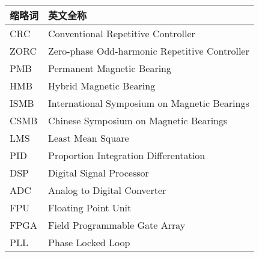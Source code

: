\noindent\begin{tabu} to \textwidth {|X[1,c]|X[4,c]|}\hline
缩略词 & 英文全称 \\ \hline
CRC & Conventional Repetitive Controller \\ \hline
ZORC & Zero-phase Odd-harmonic Repetitive Controller \\ \hline
PMB & Permanent Magnetic Bearing \\ \hline
HMB & Hybrid Magnetic Bearing \\ \hline
ISMB & International Symposium on Magnetic Bearings \\ \hline
CSMB & Chinese Symposium on Magnetic Bearings \\ \hline
LMS & Least Mean Square \\ \hline
PID & Proportion Integration Differentation\\ \hline
DSP & Digital Signal Processor \\ \hline
ADC & Analog to Digital Converter\\ \hline
FPU & Floating Point Unit\\ \hline
FPGA & Field Programmable Gate Array\\ \hline
PLL & Phase Locked Loop\\ \hline
\end{tabu}
